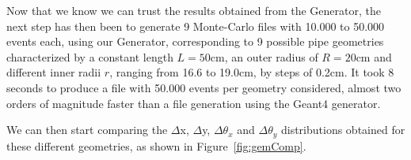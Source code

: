 \documentclass[a4paper, 11pt]{report}
\begin{document}
Now that we know we can trust the results obtained from the Generator, the next step has then been to generate 9 Monte-Carlo files with 10.000 to 50.000 events each, using our Generator, corresponding to 9 possible pipe geometries characterized by a constant length $L = 50$cm, an outer radius of $R = 20$cm and different inner radii $r$, ranging from 16.6 to 19.0cm, by steps of 0.2cm. It took 8 seconds to produce a file with 50.000 events per geometry considered, almost two orders of magnitude faster than a file generation using the Geant4 generator.

We can then start comparing the $\Delta$x, $\Delta$y, $\Delta \theta_x$ and $\Delta \theta_y$ distributions obtained for these different geometries, as shown in Figure~\ref{fig:gemComp}.

\begin{figure}[htbp]
\centering
{}

\end{figure}
\end{document}
